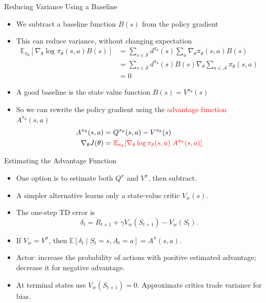 \begin{frame}{Reducing Variance Using a Baseline}
\begin{itemize}
  \item We subtract a baseline function $B(s)$ from the policy gradient
  \item This can reduce variance, without changing expectation
  \begin{align*}
  \mathbb{E}_{\pi_\theta}[\nabla_\theta \log \pi_\theta(s, a) B(s)] &= \sum_{s \in \mathcal{S}} d^{\pi_\theta}(s) \sum_a \nabla_\theta\pi_\theta(s, a) B(s)\\
  &= \sum_{s \in \mathcal{S}} d^{\pi_\theta}(s) B(s) \nabla_\theta \sum_{a \in \mathcal{A}} \pi_\theta(s, a)\\
  &= 0
  \end{align*}
  \item A good baseline is the state value function $B(s) = V^{\pi_\theta}(s)$
  \item So we can rewrite the policy gradient using the \textcolor{red}{advantage function} $A^{\pi_\theta}(s, a)$
  \begin{align*}
  A^{\pi_\theta}(s, a) &= Q^{\pi_\theta}(s, a) - V^{\pi_\theta}(s)\\
  \nabla_\theta J(\theta) &= \textcolor{red}{\mathbb{E}_{\pi_\theta}[\nabla_\theta \log \pi_\theta(s, a)\; A^{\pi_\theta}(s, a)]}
  \end{align*}
\end{itemize}
\end{frame}

\begin{frame}{Estimating the Advantage Function}
\begin{itemize}
\item One option is to estimate both $Q^\pi$ and $V^\pi$, then subtract.
\item A simpler alternative learns only a state-value critic $V_w(s)$.
\item The one-step TD error is
\[ \delta_t = R_{t+1}+\gamma V_w(S_{t+1})-V_w(S_t). \]
\item If $V_w=V^\pi$, then $\mathbb{E}[\delta_t\mid S_t=s,A_t=a]=A^\pi(s,a)$.
\item Actor: increase the probability of actions with positive estimated advantage; decrease it for negative advantage.
\item At terminal states use $V_w(S_{t+1})=0$. Approximate critics trade variance for bias.
\end{itemize}
\end{frame}

